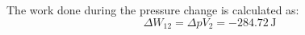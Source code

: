 The work done during the pressure change is calculated as:  
\[
\Delta W_{12} = \Delta p V_2 = -284.72 \, \text{J}
\]
